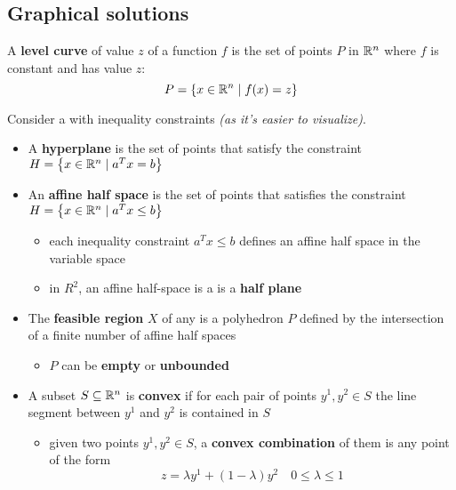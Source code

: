 \documentclass[english]{article}
\begin{document}
\subsection{Graphical solutions}

\begin{definition}
  \label{def:level-curve}
  A \textbf{level curve} of value \(z\) of a function \(f\) is the set of points \(P\) in \(\mathbb{R}^n\) where \(f\) is constant and has value \(z\):
  \[P = \left\{ x \in \mathbb{R}^n \mid f(x) = z \right\}\]
\end{definition}

\bigskip
Consider a \LP with inequality constraints \textit{(as it's easier to visualize)}.

\begin{itemize}
  \item A \textbf{hyperplane} is the set of points that satisfy the constraint
        \( H = \left\{ x \in \mathbb{R}^n \mid   a^T x = b \right\} \)
  \item An \textbf{affine half space} is the set of points that satisfies the constraint
        \(H = \left\{ x \in \mathbb{R}^n \mid   a^T x \leq b \right\} \)
        \begin{itemize}[label=\(\rightarrow\)]
          \item each inequality constraint \(a^T x \leq b\) defines an affine half space in the variable space
          \item in \(R^2\), an affine half-space is a is a \textbf{half plane}
        \end{itemize}
  \item The \textbf{feasible region} \(X\) of any \LP is a polyhedron \(P\) defined by the intersection of a finite number of affine half spaces
        \begin{itemize}[label=\(\rightarrow\)]
          \item \(P\) can be \textbf{empty} or \textbf{unbounded}
        \end{itemize}
  \item A subset \(S \subseteq \mathbb{R}^n\) is \textbf{convex} if for each pair of points \(y^1, y^2 \in S\) the line segment between \(y^1\) and \(y^2\) is contained in \(S\)
        \begin{itemize}[label=\(\rightarrow\)]
          \item given two points \(y^1, y^2 \in S\), a \textbf{convex combination} of them is any point of the form
                \[ z = \lambda y^1 + \left( 1 - \lambda \right) y^2 \quad 0 \leq \lambda \leq 1 \]

\end{itemize}
\end{itemize}
\end{document}

